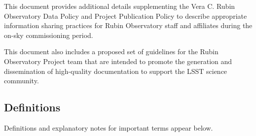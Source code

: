 \documentclass[SE,authoryear,toc]{lsstdoc}
\begin{document}
This document provides additional details supplementing the Vera C. Rubin Observatory Data Policy  and Project Publication Policy  to describe appropriate information sharing practices for Rubin Observatory staff and affiliates during the on-sky commissioning period.

This document also includes a proposed set of guidelines for the Rubin Observatory Project team that are intended to promote the generation and dissemination of high-quality documentation to support the LSST science community.


\subsection{Definitions}
\label{definitions}

Definitions and explanatory notes for important terms appear below.
\end{document}
